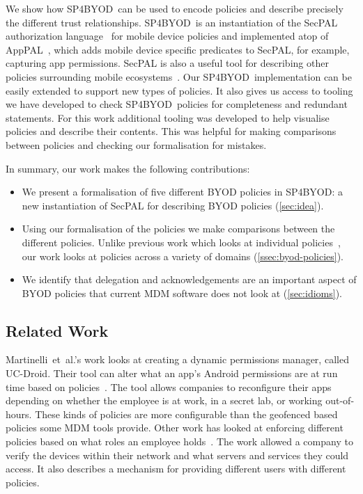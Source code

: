 \documentclass{llncs}
\makeatletter
\newcommand{\etal}{et~al.\@}
\newcommand{\AppPAL}[0]{SP4BYOD}
\makeatother
\begin{document}
We show how \AppPAL~can be used to encode policies and describe precisely the different trust relationships.
\AppPAL~is an instantiation of the SecPAL authorization language~\cite{becker_secpal:_2010} for mobile device policies and implemented atop of AppPAL~\cite{hallett_apppal_2016},
  which adds mobile device specific predicates to SecPAL, for example, capturing app permissions.
SecPAL is also a useful tool for describing other policies surrounding mobile ecosystems~\cite{hallett_specifying_2016}.
Our \AppPAL{}~implementation can be easily extended to support new types of policies.
It also gives us access to tooling we have developed to check \AppPAL{}~policies for completeness and redundant statements.
For this work additional tooling was developed to help visualise policies and describe their contents.
This was helpful for making comparisons between policies and checking our formalisation for mistakes. 


In summary, our work makes the following contributions:
\begin{itemize}[topsep=0pt]
  \item We present a formalisation of five different BYOD policies in \AppPAL: a new instantiation of SecPAL for describing BYOD policies (\autoref{sec:idea}).
  \item Using our formalisation of the policies we make comparisons between the different policies. 
    Unlike previous work which looks at individual policies~\cite{armando_developing_2016}, our work looks at policies across a variety of domains (\autoref{ssec:byod-policies}).
  \item We identify that delegation and acknowledgements are an important aspect of BYOD policies that current MDM software does not look at (\autoref{sec:idioms}).
\end{itemize}

\subsection{Related Work}
\label{sec:related}

Martinelli~\etal{}'s work looks at creating a dynamic permissions manager, called UC-Droid.
Their tool can alter what an app's Android permissions are at run time based on policies~\cite{martinelli_enhancing_2016}.
The tool allows companies to reconfigure their apps depending on whether the employee is at work, in a secret lab, or working out-of-hours.
These kinds of policies are more configurable than the geofenced based policies some \ac{MDM} tools provide.
Other work has looked at enforcing different policies based on what roles an employee holds~\cite{costantino_towards_2013}.
The work allowed a company to verify the devices within their network and what servers and services they could access.
It also describes a mechanism for providing different users with different policies.
\end{document}
